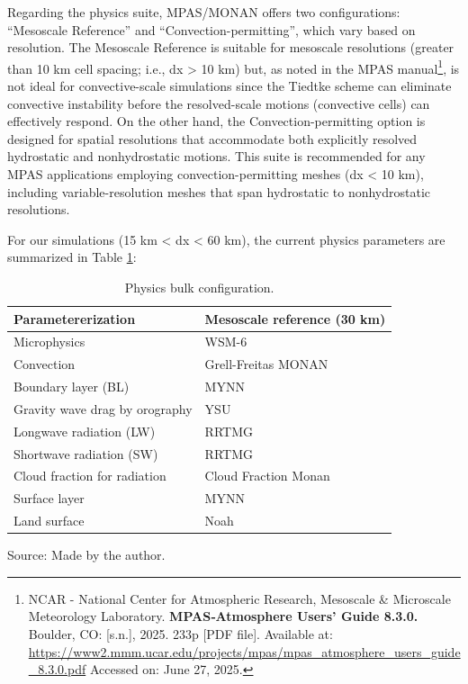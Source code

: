 Regarding the physics suite, MPAS/MONAN offers two configurations: “Mesoscale Reference” and “Convection-permitting”, which vary based on resolution. The Mesoscale Reference is suitable for mesoscale resolutions (greater than 10 km cell spacing; i.e., dx > 10 km) but, as noted in the MPAS manual\footnote{NCAR - National Center for Atmospheric Research, Mesoscale \& Microscale Meteorology Laboratory.\textbf{ MPAS‑Atmosphere Users' Guide 8.3.0.} Boulder, CO: [s.n.], 2025. 233p [PDF file]. Available at: \url{https://www2.mmm.ucar.edu/projects/mpas/mpas_atmosphere_users_guide_8.3.0.pdf} Accessed on: June 27, 2025.}, is not ideal for convective-scale simulations since the Tiedtke scheme can eliminate convective instability before the resolved-scale motions (convective cells) can effectively respond. On the other hand, the Convection-permitting option is designed for spatial resolutions that accommodate both explicitly resolved hydrostatic and nonhydrostatic motions. This suite is recommended for any MPAS applications employing convection-permitting meshes (dx < 10 km), including variable-resolution meshes that span hydrostatic to nonhydrostatic resolutions.

For our simulations (15 km < dx < 60 km), the current physics parameters are summarized in Table \ref{tab:physics-config}:

\begin{table}[htbp]
	\centering
	\caption{Physics bulk configuration.}
	\label{tab:physics-config}
	\begin{tabular}{@{}ll@{}}
		\toprule
		\textbf{Parametererization} & \textbf{Mesoscale reference (30 km)} \\
		\midrule
		Microphysics & WSM-6 \\
		Convection & Grell-Freitas MONAN \\
		Boundary layer (BL) & MYNN \\
		Gravity wave drag by orography & YSU \\
		Longwave radiation (LW) & RRTMG \\
		Shortwave radiation (SW) & RRTMG \\
		Cloud fraction for radiation & Cloud Fraction Monan \\
		Surface layer & MYNN \\
		Land surface & Noah \\
		\bottomrule
	\end{tabular}
	
	\vspace{2mm}
	{\centering Source: Made by the author.\par}
	
\end{table}

